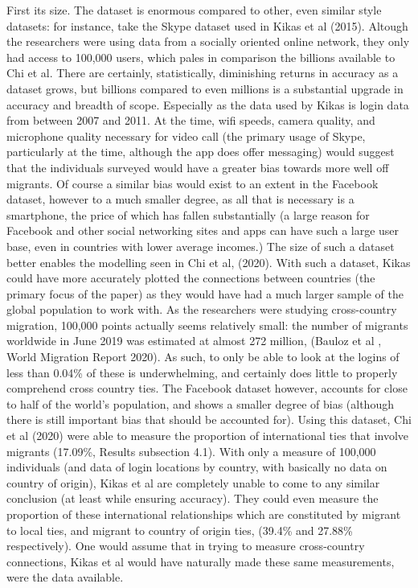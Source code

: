 \documentclass[12pt]{article}
\begin{document}
First its size. The dataset is enormous compared to other, even similar style datasets: 
for instance, take the Skype dataset used in Kikas et al (2015). Altough the researchers 
were using data from a socially oriented online network, they only had access to 100,000 
users, which pales in comparison the billions available to Chi et al. There are 
certainly, statistically, diminishing returns in accuracy as a dataset grows, but billions 
compared to even millions is a substantial upgrade in accuracy and breadth of scope. 
Especially as the data used by Kikas is login data from between 2007 and 2011. At the time, 
wifi speeds, camera quality, and microphone quality necessary for video call (the primary 
usage of Skype, particularly at the time, although the app does offer messaging) would
suggest that the individuals surveyed would have a greater bias towards more well off 
migrants. Of course a similar bias would exist to an extent in the Facebook dataset, 
however to a much smaller degree, as all that is necessary is a smartphone, the price of 
which has fallen substantially (a large reason for Facebook and other social networking 
sites and apps can have such a large user base, even in countries with lower average incomes.)
The size of such a dataset better enables the modelling seen in Chi et al, (2020). With such 
a dataset, Kikas could have more accurately plotted the connections between countries (the 
primary focus of the paper) as they would have had a much larger sample of the global 
population to work with. As the researchers were studying cross-country migration, 
100,000 points actually seems relatively small: the number of migrants worldwide in June 2019
was estimated at almost 272 million, (Bauloz et al , World Migration Report 2020). As such, 
to only be able to look at the logins of less than 0.04\% of these is underwhelming, 
and certainly does little to properly comprehend cross country ties. The Facebook dataset 
however, accounts for close to half of the world's population, and shows a smaller degree 
of bias (although there is still important bias that should be accounted for). Using this 
dataset, Chi et al (2020) were able to measure the proportion of international ties that 
involve migrants (17.09\%, Results subsection 4.1). With only a measure of 100,000 
individuals (and data of login locations by country, with basically no data on country 
of origin), Kikas et al are completely unable to come to any similar conclusion (at least 
while ensuring accuracy). They could even measure the proportion of these international 
relationships which are constituted by migrant to local ties, and migrant to country of origin 
ties, (39.4\% and 27.88\% respectively). One would assume that in trying to measure cross-country 
connections, Kikas et al would have naturally made these same measurements, were the data 
available. 
\end{document}
